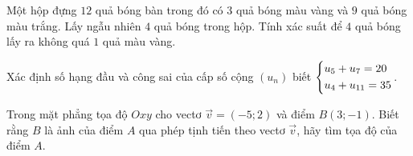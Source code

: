\begin{bt}%
	Một hộp đựng $12$ quả bóng bàn trong đó có $3$ quả bóng màu vàng và $9$ quả bóng màu trắng. Lấy ngẫu nhiên $4$ quả bóng trong hộp. Tính xác suất để $4$ quả bóng lấy ra không quá $1$ quả màu vàng.
\end{bt}

\begin{bt}%
	Xác định số hạng đầu và công sai của cấp số cộng $(u_n)$ biết $\left\{\begin{aligned}&u_5+u_7=20\\&u_4+u_{11}=35\end{aligned}\right.$.
\end{bt}

\begin{bt}%
	Trong mặt phẳng tọa độ $Oxy$ cho vectơ $\vec{v}=(-5;2)$ và điểm $B(3;-1)$. Biết rằng $B$ là ảnh của điểm $A$ qua phép tịnh tiến theo vectơ $\vec{v}$, hãy tìm tọa độ của điểm $A$.
\end{bt}

